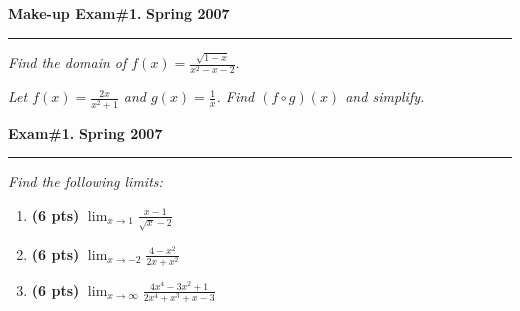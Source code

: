 \documentclass[12pt]{article}
\begin{document}
\hfill{\large\bf Make-up Exam\#1.}\hfill{\large\bf
  Spring 2007}\hrule

\bigskip
{\problem[10 pts] \em Find the domain of $f(x) =
  \displaystyle{\frac{\sqrt{1-x}}{x^2-x-2}}.$}
\vspace{8cm}
 \begin{flushright}
 \end{flushright}

{\problem[10 pts] \em Let $f(x) = \displaystyle{\frac{2x}{x^2+1}}$ and $g(x) =
  \displaystyle{\frac{1}{x}}$. Find $( f \circ g )(x)$ and simplify.
\vspace{8cm}
 \begin{flushright}
 \end{flushright}
\newpage

\hfill{\large\bf Exam\#1.}\hfill{\large\bf
  Spring 2007}\hrule

\bigskip
{\problem \em Find the following limits:}
\begin{enumerate}
\item {\bf (6 pts)} $\displaystyle{\lim_{x \to 1} \frac{x-1}{\sqrt{x} - 2}}$
  \vspace{1cm}
  \begin{flushright}
  \end{flushright}
\item {\bf (6 pts)} $\displaystyle{\lim_{x \to -2} \frac{4-x^2}{2x+x^2}}$
  \vspace{1cm}
  \begin{flushright}
  \end{flushright}
\item {\bf (6 pts)} $\displaystyle{\lim_{x \to \infty}
    \frac{4x^4-3x^2+1}{2x^4+x^3+x-3}}$
  \vspace{1cm}
  \begin{flushright}
  \end{flushright}
\end{enumerate}

}
\end{document}
